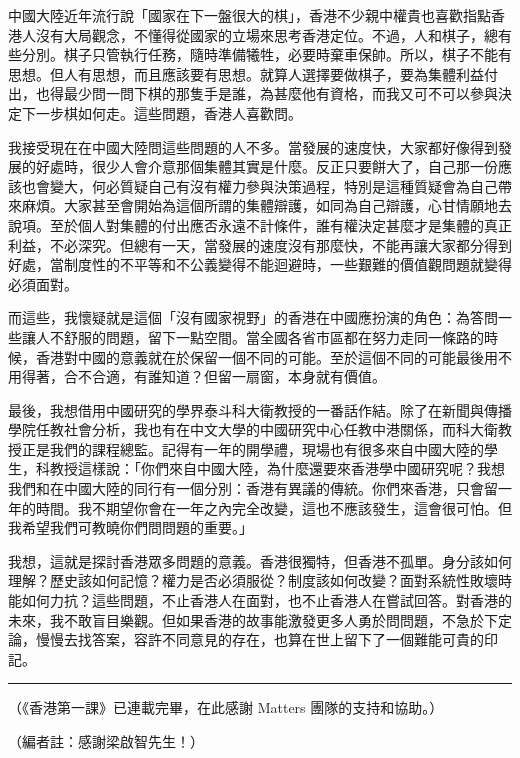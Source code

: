 中國大陸近年流行說「國家在下一盤很大的棋」，香港不少親中權貴也喜歡指點香港人沒有大局觀念，不懂得從國家的立場來思考香港定位。不過，人和棋子，總有些分別。棋子只管執行任務，隨時準備犧牲，必要時棄車保帥。所以，棋子不能有思想。但人有思想，而且應該要有思想。就算人選擇要做棋子，要為集體利益付出，也得最少問一問下棋的那隻手是誰，為甚麼他有資格，而我又可不可以參與決定下一步棋如何走。這些問題，香港人喜歡問。

我接受現在在中國大陸問這些問題的人不多。當發展的速度快，大家都好像得到發展的好處時，很少人會介意那個集體其實是什麼。反正只要餅大了，自己那一份應該也會變大，何必質疑自己有沒有權力參與決策過程，特別是這種質疑會為自己帶來麻煩。大家甚至會開始為這個所謂的集體辯護，如同為自己辯護，心甘情願地去說項。至於個人對集體的付出應否永遠不計條件，誰有權決定甚麼才是集體的真正利益，不必深究。但總有一天，當發展的速度沒有那麼快，不能再讓大家都分得到好處，當制度性的不平等和不公義變得不能迴避時，一些艱難的價值觀問題就變得必須面對。

而這些，我懷疑就是這個「沒有國家視野」的香港在中國應扮演的角色：為答問一些讓人不舒服的問題，留下一點空間。當全國各省市區都在努力走同一條路的時候，香港對中國的意義就在於保留一個不同的可能。至於這個不同的可能最後用不用得著，合不合適，有誰知道？但留一扇窗，本身就有價值。

最後，我想借用中國研究的學界泰斗科大衛教授的一番話作結。除了在新聞與傳播學院任教社會分析，我也有在中文大學的中國研究中心任教中港關係，而科大衛教授正是我們的課程總監。記得有一年的開學禮，現場也有很多來自中國大陸的學生，科教授這樣說：「你們來自中國大陸，為什麼還要來香港學中國研究呢？我想我們和在中國大陸的同行有一個分別：香港有異議的傳統。你們來香港，只會留一年的時間。我不期望你會在一年之內完全改變，這也不應該發生，這會很可怕。但我希望我們可教曉你們問問題的重要。」

我想，這就是探討香港眾多問題的意義。香港很獨特，但香港不孤單。身分該如何理解？歷史該如何記憶？權力是否必須服從？制度該如何改變？面對系統性敗壞時能如何力抗？這些問題，不止香港人在面對，也不止香港人在嘗試回答。對香港的未來，我不敢盲目樂觀。但如果香港的故事能激發更多人勇於問問題，不急於下定論，慢慢去找答案，容許不同意見的存在，也算在世上留下了一個難能可貴的印記。

\rule[-10pt]{15cm}{0.05em}

（《香港第一課》已連載完畢，在此感謝 Matters 團隊的支持和協助。）

（編者註：感謝梁啟智先生！）